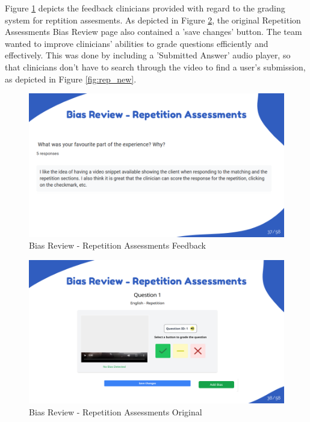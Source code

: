 \documentclass{article}
\begin{document}
Figure \ref{fig:rep_feedback} depicts the feedback clinicians provided with regard to the grading system for reptition assesments.
As depicted in Figure \ref{fig:rep_old}, the original Repetition Assessments Bias Review page also contained a 'save changes' button.
The team wanted to improve clinicians' abilities to grade questions efficiently and effectively. This was done by including a 'Submitted Answer' audio player,
so that clinicians don't have to search through the video to find a user's submission, as depicted in Figure \ref{fig:rep_new}.

\begin{figure}[H]
  \centering
  \includegraphics[width=\textwidth]{images/slide37.png}
  \caption{Bias Review - Repetition Assessments Feedback}
  \label{fig:rep_feedback}
\end{figure}

\begin{figure}[H]
  \centering
  \includegraphics[width=\textwidth]{images/slide38.png}
  \caption{Bias Review - Repetition Assessments Original}
  \label{fig:rep_old}
\end{figure}
\end{document}
